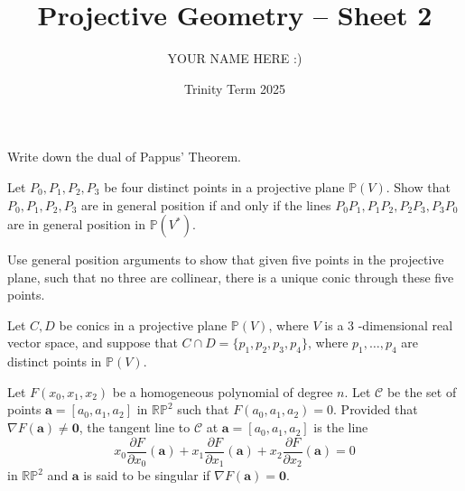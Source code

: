 \documentclass[answers]{exam}
\title{Projective Geometry -- Sheet 2}
\author{YOUR NAME HERE :)}
\date{Trinity Term 2025}
\begin{document}
\maketitle
\begin{questions}

\question%
Write down the dual of Pappus' Theorem.



\question%
Let $P_0, P_1, P_2, P_3$ be four distinct points in a projective plane $\mathbb{P}(V)$. Show that $P_0, P_1, P_2, P_3$ are in general position if and only if the lines $P_0 P_1, P_1 P_2, P_2 P_3, P_3 P_0$ are in general position in $\mathbb{P}(V^{*})$.



\question%
Use general position arguments to show that given five points in the projective plane, such that no three are collinear, there is a unique conic through these five points.



\question%
Let $C, D$ be conics in a projective plane $\mathbb{P}(V)$, where $V$ is a 3 -dimensional real vector space, and suppose that $C \cap D=\{p_1, p_2, p_3, p_4\}$, where $p_1, \ldots, p_4$ are distinct points in $\mathbb{P}(V)$.



\question%
Let $F\left(x_0, x_1, x_2\right)$ be a homogeneous polynomial of degree $n$. Let $\mathcal{C}$ be the set of points $\mathbf{a}=[a_0, a_1, a_2]$ in $\mathbb{R P}^2$ such that $F(a_0, a_1, a_2)=0$. Provided that $\nabla F(\mathbf{a}) \neq \mathbf0$, the tangent line to $\mathcal{C}$ at $\mathbf{a}=[a_0, a_1, a_2]$ is the line \[
	x_0 \frac{\partial F}{\partial x_0}(\mathbf{a})+x_1 \frac{\partial F}{\partial x_1}(\mathbf{a})+x_2 \frac{\partial F}{\partial x_2}(\mathbf{a})=0
\] in $\mathbb{R P}^2$ and $\mathbf{a}$ is said to be singular if $\nabla F(\mathbf{a})=\mathbf0$.
\begin{parts}

\end{parts}
\end{questions}
\end{document}
